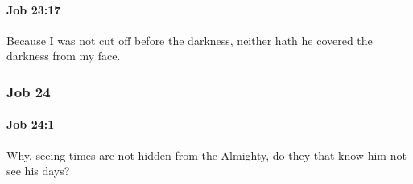 		\paragraph{Job 23:17} %
			\label{JOB-23-17}

			Because I was not cut off before the darkness, neither hath he covered the darkness from my face.

	\subsubsection{Job 24} %
		\label{JOB-24}

		\paragraph{Job 24:1} %
			\label{JOB-24-1}

			Why, seeing times are not hidden from the Almighty, do they that know him not see his days?

